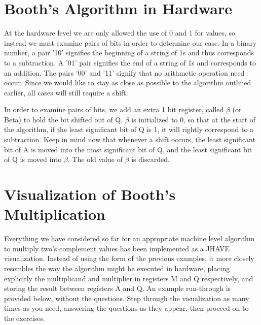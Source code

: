 \documentclass{article}
\begin{document}
\section{Booth's Algorithm in Hardware}
    At the hardware level we are only allowed the use of 0 and 1 for values, so instead we must examine pairs of bits in order to determine our case. In a binary number, a pair '10' signifies the beginning of a string of 1s and thus corresponds to a subtraction. A '01' pair signifies the end of a string of 1s and corresponds to an addition. The pairs '00' and '11' signify that no arithmetic operation need occur. Since we would like to stay as close as possible to the algorithm outlined earlier, all cases will still require a shift.

    In order to examine pairs of bits, we add an extra 1 bit register, called $\beta$ (or Beta) to hold the bit shifted out of Q. $\beta$ is initialized to 0, so that at the start of the algorithm, if the least significant bit of Q is 1, it will rightly correspond to a subtraction. Keep in mind now that whenever a shift occurs, the least significant bit of A is moved into the most significant bit of Q, and the least significant bit of Q is moved into $\beta$. The old value of $\beta$ is discarded.

\section{Visualization of Booth's Multiplication}
Everything we have considered so far for an appropriate machine level algorithm to multiply two's complement values has been implemented as a JHAVE visualization. Instead of using the form of the previous examples, it more closely resembles the way the algorithm might be executed in hardware, placing explicitly the multiplicand and multiplier in registers M and Q respectively, and storing the result between registers A and Q. An example run-through is provided below, without the questions. Step through the visualization as many times as you need, answering the questions as they appear, then proceed on to the exercises.


%
%
\end{document}

